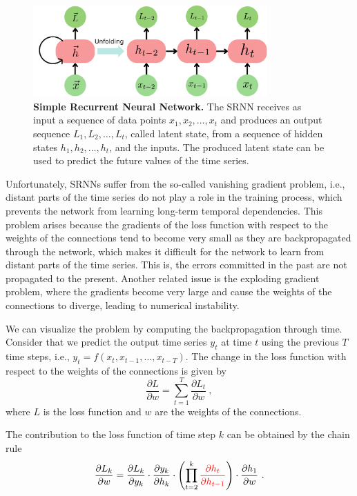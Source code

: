 \begin{figure}[H]
  \centering
  \includegraphics[width=0.8\textwidth]{Figures/RNN.pdf}
  \caption[Simple Recurrent Neural Network]{
    \textbf{Simple Recurrent Neural Network.} The SRNN receives as input a
    sequence of data points $x_1, x_2, \ldots, x_t$ and produces an output
    sequence $L_1, L_2, \ldots, L_t$, called latent state, from a sequence of
    hidden states $h_1, h_2, \ldots, h_t$, and the inputs. The produced
    latent
    state can be used to predict the future values of the time series.}
  \label{fig:SRNN_scheme}
\end{figure}

Unfortunately, SRNNs suffer from the so-called vanishing gradient problem,
i.e.,
distant parts of the time series do not play a role in the training process,
which prevents the network from learning long-term temporal dependencies.
This
problem arises because the gradients of the loss function with respect to the
weights of the connections tend to become very small as they are
backpropagated
through the network, which makes it difficult for the network to learn from
distant parts of the time series. This is, the errors committed in the past
are
not propagated to the present. Another related issue is the exploding
gradient
problem, where the gradients become very large and cause the weights of the
connections to diverge, leading to numerical instability.

We can visualize the problem by computing the backpropagation through time.
Consider that we predict the output time series $y_t$ at time $t$ using the
previous $T$ time steps, i.e., $y_t = f(x_t, x_{t-1}, \ldots, x_{t-T})$. The
change in the loss function with respect to the weights of the connections is
given by
\begin{equation}\label{eq:loss_RNN}
  \frac{\partial L}{\partial w} = \sum_{t=1}^{T} \frac{\partial L_t}{\partial
    w} \ ,
\end{equation}
where $L$ is the loss function and $w$ are the weights of the connections.

The contribution to the loss function of time step $k$ can be obtained by the
chain rule
\begin{equation}
  \frac{\partial L_k}{\partial w} = \frac{\partial L_k}{\partial
    y_k}\cdot\frac{\partial y_k}{\partial
    h_k}\cdot\left(\prod_{t=2}^k\textcolor{red}{\frac{\partial
      h_t}{\partial h_{t-1}}}\right)\cdot\frac{\partial h_1}{\partial w} \ .
\end{equation}

